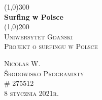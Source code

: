 \documentclass{article}
\begin{document}
\begin{titlepage}
	\begin{center}
	\line(1,0){300} \\
	[0.25in]
	\huge{\bfseries Surfing w Polsce} \\
	[2mm]
	\line(1,0){200} \\
	[1.5cm]
	\textsc{\LARGE Uniwersytet Gdański} \\
	[0.75cm]
	\textsc{\Large Projekt o surfingu w Polsce} \\
	[10cm]
	\end{center}
	\begin{flushright}
	\textsc{\large Nicolas W. \\
	Środowisko Programisty \\ 
	\# 275512 \\
	8 stycznia 2021r. \\}
	\end{flushright}
\end{titlepage}
\end{document}
